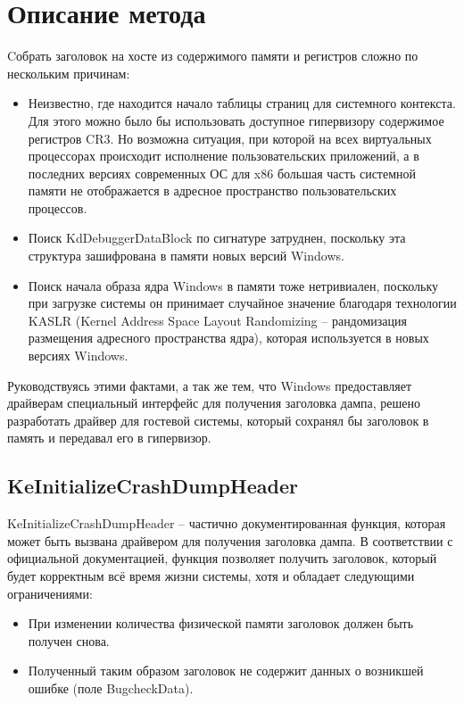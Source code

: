 \documentclass{mipt-thesis-bs}
\begin{document}
\chapter{Описание метода}

Cобрать заголовок на хосте из содержимого памяти и регистров сложно по нескольким причинам:

\begin{itemize}
\item Неизвестно, где находится начало таблицы страниц для системного контекста. Для этого можно было бы использовать доступное гипервизору содержимое регистров CR3. Но возможна ситуация, при которой на всех виртуальных процессорах происходит исполнение пользовательских приложений, а в последних версиях современных ОС для x86 большая часть системной памяти не отображается в адресное пространство пользовательских процессов.
\item Поиск KdDebuggerDataBlock по сигнатуре затруднен, поскольку эта структура зашифрована в памяти новых версий Windows\cite{kdbgenc}.
\item Поиск начала образа ядра Windows в памяти тоже нетривиален, поскольку при загрузке системы он принимает случайное значение благодаря технологии KASLR (Kernel Address Space Layout Randomizing -- рандомизация размещения адресного пространства ядра), которая используется в новых версиях Windows.
\end{itemize}

Руководствуясь этими фактами, а так же тем, что Windows предоставляет драйверам специальный интерфейс для получения заголовка дампа, решено разработать драйвер для гостевой системы, который сохранял бы заголовок в память и передавал его в гипервизор.

\section*{KeInitializeCrashDumpHeader}

KeInitializeCrashDumpHeader -- частично документированная функция, которая может быть вызвана драйвером для получения заголовка дампа\cite{kicdh}.
В соответствии с официальной документацией, функция позволяет получить заголовок, который будет корректным всё время жизни системы, хотя и обладает следующими ограничениями:

\begin{itemize}
\item При изменении количества физической памяти заголовок должен быть получен снова.
\item Полученный таким образом заголовок не содержит данных о возникшей ошибке (поле BugcheckData).
\end{itemize}
\end{document}

